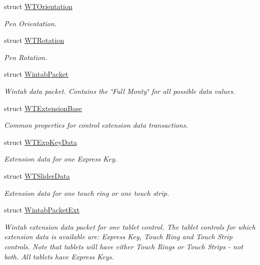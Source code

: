 \begin{DoxyCompactItemize}
struct \hyperlink{struct_wintab_d_n_1_1_w_t_orientation}{WTOrientation}
\begin{DoxyCompactList}\small\item\em Pen Orientation. \item\end{DoxyCompactList}\item 
struct \hyperlink{struct_wintab_d_n_1_1_w_t_rotation}{WTRotation}
\begin{DoxyCompactList}\small\item\em Pen Rotation. \item\end{DoxyCompactList}\item 
struct \hyperlink{struct_wintab_d_n_1_1_wintab_packet}{WintabPacket}
\begin{DoxyCompactList}\small\item\em Wintab data packet. Contains the \char`\"{}Full Monty\char`\"{} for all possible data values. \item\end{DoxyCompactList}\item 
struct \hyperlink{struct_wintab_d_n_1_1_w_t_extension_base}{WTExtensionBase}
\begin{DoxyCompactList}\small\item\em Common properties for control extension data transactions. \item\end{DoxyCompactList}\item 
struct \hyperlink{struct_wintab_d_n_1_1_w_t_exp_key_data}{WTExpKeyData}
\begin{DoxyCompactList}\small\item\em Extension data for one Express Key. \item\end{DoxyCompactList}\item 
struct \hyperlink{struct_wintab_d_n_1_1_w_t_slider_data}{WTSliderData}
\begin{DoxyCompactList}\small\item\em Extension data for one touch ring or one touch strip. \item\end{DoxyCompactList}\item 
struct \hyperlink{struct_wintab_d_n_1_1_wintab_packet_ext}{WintabPacketExt}
\begin{DoxyCompactList}\small\item\em Wintab extension data packet for one tablet control. The tablet controls for which extension data is available are: Express Key, Touch Ring and Touch Strip controls. Note that tablets will have either Touch Rings or Touch Strips -\/ not both. All tablets have Express Keys. \item\end{DoxyCompactList}\item 

\end{DoxyCompactItemize}

